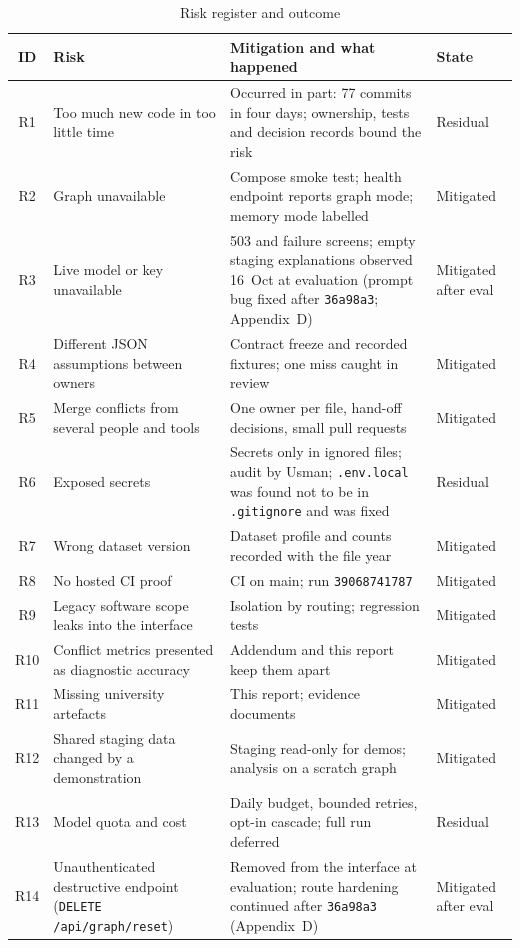 \begin{table}[H]
\centering
\caption{Risk register and outcome}
\label{tab:risks}
\small
\begin{tabularx}{\textwidth}{@{}c >{\raggedright\arraybackslash}p{} L >{\raggedright\arraybackslash}p{0.14\textwidth}@{}}
\toprule
ID & Risk & Mitigation and what happened & State \\
\midrule
R1 & Too much new code in too little time & Occurred in part: 77 commits in four days; ownership, tests and decision records bound the risk & Residual \\
R2 & Graph unavailable & Compose smoke test; health endpoint reports graph mode; memory mode labelled & Mitigated \\
R3 & Live model or key unavailable & 503 and failure screens; empty staging explanations observed 16~Oct at evaluation (prompt bug fixed after \texttt{36a98a3}; Appendix~D) & Mitigated after eval \\
R4 & Different JSON assumptions between owners & Contract freeze and recorded fixtures; one miss caught in review & Mitigated \\
R5 & Merge conflicts from several people and tools & One owner per file, hand-off decisions, small pull requests & Mitigated \\
R6 & Exposed secrets & Secrets only in ignored files; audit by Usman; \texttt{.env.local} was found not to be in \texttt{.gitignore} and was fixed & Residual \\
R7 & Wrong dataset version & Dataset profile and counts recorded with the file year & Mitigated \\
R8 & No hosted CI proof & CI on main; run \texttt{39068741787} & Mitigated \\
R9 & Legacy software scope leaks into the interface & Isolation by routing; regression tests & Mitigated \\
R10 & Conflict metrics presented as diagnostic accuracy & Addendum and this report keep them apart & Mitigated \\
R11 & Missing university artefacts & This report; evidence documents & Mitigated \\
R12 & Shared staging data changed by a demonstration & Staging read-only for demos; analysis on a scratch graph & Mitigated \\
R13 & Model quota and cost & Daily budget, bounded retries, opt-in cascade; full run deferred & Residual \\
R14 & Unauthenticated destructive endpoint (\texttt{DELETE /api/graph/reset}) & Removed from the interface at evaluation; route hardening continued after \texttt{36a98a3} (Appendix~D) & Mitigated after eval \\
\bottomrule
\end{tabularx}
\end{table}

